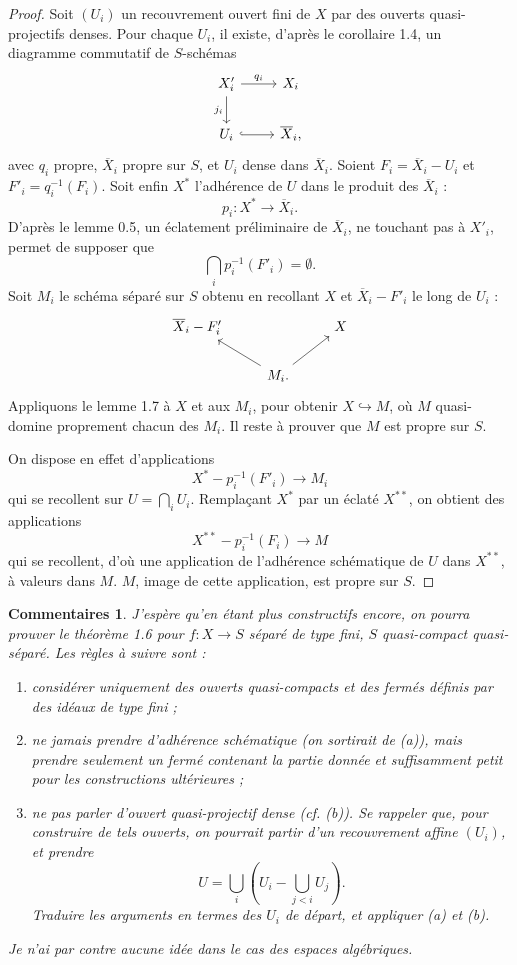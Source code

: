 \documentclass[11pt]{article}
\newtheorem*{comments}{Commentaires}
\begin{document}
\begin{proof}
Soit \((U_i)\) un recouvrement ouvert fini de \(X\) par des ouverts quasi-projectifs denses. Pour chaque \(U_i\), il existe, d'après le corollaire 1.4, un diagramme commutatif de \(S\)-schémas
\[
\begin{tikzcd}
X'_i \ar[r,"q_i"] \ar[d,"j_i"'] & X_i \\
U_i \ar[r,hook] & \overline X_i,
\end{tikzcd}
\]
avec \(q_i\) propre, \(\overline X_i\) propre sur \(S\), et \(U_i\) dense dans \(\overline X_i\). Soient \(F_i=\overline X_i-U_i\) et \(F'_i=q_i^{-1}(F_i)\). Soit enfin \(X^*\) l'adhérence de \(U\) dans le produit des \(\overline X_i\) :
\[
p_i:X^*\longrightarrow \overline X_i.
\]
D'après le lemme 0.5, un éclatement préliminaire de \(\overline X_i\), ne touchant pas à \(X'_i\), permet de supposer que
\[
\bigcap_i p_i^{-1}(F'_i)=\emptyset.
\]
Soit \(M_i\) le schéma séparé sur \(S\) obtenu en recollant \(X\) et \(\overline X_i-F'_i\) le long de \(U_i\) :
\[
\begin{tikzcd}
\overline X_i-F'_i && X \\
& M_i. \ar[ul] \ar[ur]
\end{tikzcd}
\]
Appliquons le lemme 1.7 à \(X\) et aux \(M_i\), pour obtenir \(X\hookrightarrow M\), où \(M\) quasi-domine proprement chacun des \(M_i\). Il reste à prouver que \(M\) est propre sur \(S\).

On dispose en effet d'applications
\[
X^*-p_i^{-1}(F'_i)\longrightarrow M_i
\]
qui se recollent sur \(U=\bigcap_i U_i\). Remplaçant \(X^*\) par un éclaté \(X^{**}\), on obtient des applications
\[
X^{**}-p_i^{-1}(F_i)\longrightarrow M
\]
qui se recollent, d'où une application de l'adhérence schématique de \(U\) dans \(X^{**}\), à valeurs dans \(M\). \(M\), image de cette application, est propre sur \(S\).
\end{proof}

\begin{comments}
J'espère qu'en étant plus constructifs encore, on pourra prouver le théorème 1.6 pour \(f:X\to S\) séparé de type fini, \(S\) quasi-compact quasi-séparé. Les règles à suivre sont :
\begin{enumerate}[label=(\alph*)]
\item considérer uniquement des ouverts quasi-compacts et des fermés définis par des idéaux de type fini ;
\item ne jamais prendre d'adhérence schématique (on sortirait de (a)), mais prendre seulement un fermé contenant la partie donnée et suffisamment petit pour les constructions ultérieures ;
\item ne pas parler d'ouvert quasi-projectif dense (cf. (b)). Se rappeler que, pour construire de tels ouverts, on pourrait partir d'un recouvrement affine \((U_i)\), et prendre
\[
U=\bigcup_i\left(U_i-\bigcup_{j<i}U_j\right).
\]
Traduire les arguments en termes des \(U_i\) de départ, et appliquer (a) et (b).
\end{enumerate}
Je n'ai par contre aucune idée dans le cas des espaces algébriques.
\end{comments}
\end{document}
